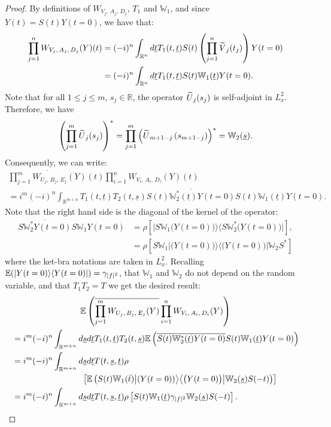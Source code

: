 \documentclass[10pt]{amsart}
\theoremstyle{definition}\newtheorem{defi}[theo]{Definition}\newtheorem{rema}[theo]{Remark}\newtheorem{exam}[theo]{Example}\newtheorem{exem}[theo]{Example}\newtheorem{nota}[theo]{Notation}
\newcommand{\R}{\mathbb{R}}
\newcommand{\E}{\mathbb{E}}
\newcommand{\bbW}{\mathbb{W}}
\let\oldtilde\tilde
\renewcommand*{\tilde}[1]{\mathchoice{\widetilde{#1}}{\widetilde{#1}}{\oldtilde{#1}}{\oldtilde{#1}}}
\begin{document}
\begin{proof}
By definitions of $W_{V_j,\,A_j,\,D_j} $, $T_1$ and $\bbW_1$, and since $Y(t)=S(t)Y(t=0)$, we have that:
\begin{align*}
\prod_{j=1}^n W_{V_j,\,A_j,\,D_j} (Y)(t)&= (-i)^n \int_{\R^n} d\underline t T_1(t,\underline t) S(t)\left(\prod_{j=1}^n \tilde V_j(t_{j})\right) Y(t=0)\\
&= (-i)^n \int_{\R^n} d\underline t T_1(t,\underline t) S(t)\bbW_1(\underline t) Y(t=0).
\end{align*}
Note that for all $1\leq j \leq m$, $s_j\in \R$, the operator $\tilde U_j(s_j)$ is self-adjoint in $L^2_x$. Therefore, we have
\[
\left(\prod_{j=1}^m \tilde U_j(s_{j})\right)^*= \prod_{j=1}^m \left(\tilde U_{m+1-j}\left(s_{m+1-j}\right)\right)^*=\bbW_2(\underline s).
\]
Consequently, we can write:
\begin{multline*}
\overline{\prod_{j=1}^m W_{U_j,\,B_j,\,E_j} (Y)}(t) \prod_{i=1}^n W_{V_i,\,A_i,\,D_i}(Y)(t)\\
=i^m(-i)^n \int_{\R^{m+n}} T_1(t,\underline t)T_2(t,\underline s)\overline{S(t)\bbW_2^*(\underline t) Y(t=0)} S(t)\bbW_1(\underline t) Y(t=0).
\end{multline*}
Note that the right hand side is the diagonal of the kernel of the operator:
\begin{align*}
\overline{S\bbW_2^* Y(t=0)}S\bbW_1Y(t=0)&=\rho\left[\big| S \bbW_1 \big(Y(t=0)\big) \big\rangle \big\langle S \bbW_2^* \big(Y(t=0)\big)\big|\right],\\
&=\rho \left[S \bbW_1 \big| \big(Y(t=0)\big) \big\rangle \big\langle \big(Y(t=0)\big)\big| \bbW_2S^*\right]
\end{align*}
where the ket-bra notations are taken in $L^2_x$. Recalling $\E(| Y(t=0) \rangle \langle Y(t=0) |)\linebreak= \gamma_{|f|^2}$, that $\bbW_1$ and $\bbW_2$ do not depend on the random variable, and that $T_1T_2=T$ we get the desired result:
\begin{multline*}
\E \left(\overline{\prod_{j=1}^m W_{U_j,\,B_j,\,E_j} (Y)} \prod_{i=1}^n W_{V_i,\,A_i,\,D_i}(Y)\right) \\
\begin{aligned}
& =i^m(-i)^n \int_{\R^{m+n}} d\underline s d\underline t T_1(t,\underline t)T_2(t,\underline s)\E \left(\overline{S(t)\bbW_2^*(\underline t) Y(t=0)} S(t)\bbW_1(\underline t) Y(t=0)\right) \\
& =i^m(-i)^n \int_{\R^{m+n}} d\underline s d\underline t T(t,\underline s,\underline t)\rho\\
&\mkern150mu\left[\E \left(S(t) \bbW_1(\bar t) \big| (Y(t=0)) \big\rangle \big\langle \big(Y(t=0)\big)\big| \bbW_2(\underline s)S(-t)\right)\right] \\
& =i^m(-i)^n \int_{\R^{m+n}} d\underline s d\underline t T(t,\underline s,\underline t)\rho \left[S(t) \bbW_1(\underline t) \gamma_{|f|^2} \bbW_2(\underline s)S(-t) \right].\qedhere
\end{aligned}
\end{multline*}
\end{proof}
\end{document}
